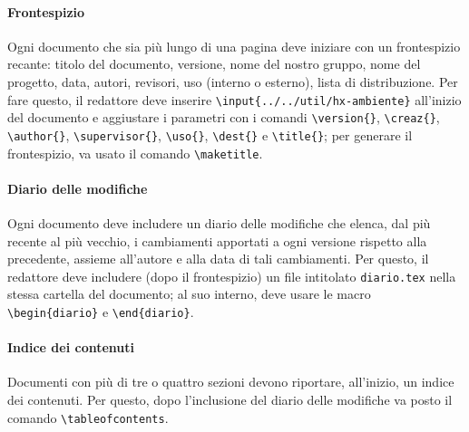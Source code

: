 \paragraph{Frontespizio} Ogni documento che sia più lungo di una pagina deve iniziare con un frontespizio recante: titolo del documento, versione, nome del nostro gruppo, nome del progetto, data, autori, revisori, uso (interno o esterno), lista di distribuzione. Per fare questo, il redattore deve inserire \texttt{\textbackslash input\{../../util/hx-ambiente\}} all'inizio del documento e aggiustare i parametri con i comandi \texttt{\textbackslash version\{\}}, \texttt{\textbackslash creaz\{\}}, \texttt{\textbackslash author\{\}}, \texttt{\textbackslash supervisor\{\}}, \texttt{\textbackslash uso\{\}}, \texttt{\textbackslash dest\{\}} e \texttt{\textbackslash title\{\}}; per generare il frontespizio, va usato il comando \texttt{\textbackslash maketitle}.
\paragraph{Diario delle modifiche} Ogni documento deve includere un diario delle modifiche che elenca, dal più recente al più vecchio, i cambiamenti apportati a ogni versione rispetto alla precedente, assieme all'autore e alla data di tali cambiamenti. Per questo, il redattore deve includere (dopo il frontespizio) un file intitolato \texttt{diario.tex} nella stessa cartella del documento; al suo interno, deve usare le macro \texttt{\textbackslash begin\{diario\}} e \texttt{\textbackslash end\{diario\}}.
\paragraph{Indice dei contenuti} Documenti con più di tre o quattro sezioni devono riportare, all'inizio, un indice dei contenuti. Per questo, dopo l'inclusione del diario delle modifiche va posto il comando \texttt{\textbackslash tableofcontents}.
